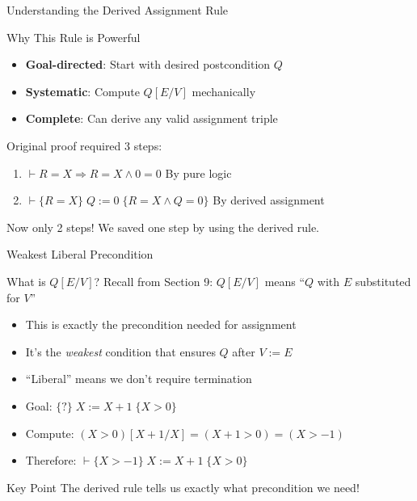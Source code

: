 \begin{frame}{Understanding the Derived Assignment Rule}
    \begin{block}{Why This Rule is Powerful}
        \begin{itemize}
            \item \textbf{Goal-directed}: Start with desired postcondition $Q$
            \item \textbf{Systematic}: Compute $Q[E/V]$ mechanically
            \item \textbf{Complete}: Can derive any valid assignment triple
        \end{itemize}
    \end{block}
    
    \begin{example}
        Original proof required 3 steps:
        \begin{enumerate}
            \item $\vdash R=X \Rightarrow R=X \wedge 0=0$ \hfill By pure logic
            \item $\vdash \{R=X\} \; Q:=0 \; \{R=X \wedge Q=0\}$ \hfill By derived assignment
        \end{enumerate}
        Now only 2 steps! We saved one step by using the derived rule.
    \end{example}
\end{frame}

\begin{frame}{Weakest Liberal Precondition}
    \begin{block}{What is $Q[E/V]$?}
        Recall from Section 9: $Q[E/V]$ means ``$Q$ with $E$ substituted for $V$''
        \begin{itemize}
            \item This is exactly the precondition needed for assignment
            \item It's the \emph{weakest} condition that ensures $Q$ after $V:=E$
            \item ``Liberal'' means we don't require termination
        \end{itemize}
    \end{block}
    
    \begin{example}
        \begin{itemize}
            \item Goal: $\{?\} \; X:=X+1 \; \{X>0\}$
            \item Compute: $(X>0)[X+1/X] = (X+1>0) = (X>-1)$
            \item Therefore: $\vdash \{X>-1\} \; X:=X+1 \; \{X>0\}$
        \end{itemize}
    \end{example}
    
    \begin{alertblock}{Key Point}
        The derived rule tells us exactly what precondition we need!
    \end{alertblock}
\end{frame}

